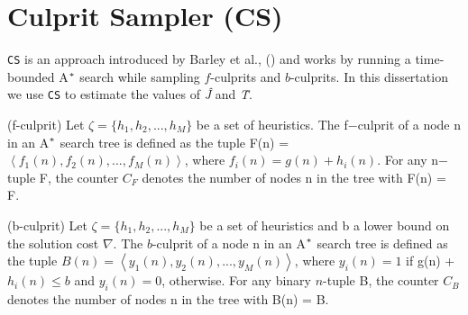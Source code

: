 \section{Culprit Sampler (CS)}
\noindent
\texttt{CS} is an approach introduced by Barley et al., (\citeyear{BarleySantiagoOver}) and works by running a time-bounded A$\sp{*}$ search while sampling $f$-culprits and $b$-culprits. In this dissertation we use \texttt{CS} to estimate the values of \textit{\^{J}} and \textit{\^{T}}.

\begin{definition}(f-culprit)
Let $\zeta = \{h_{1}, h_{2},...,h_{M}\}$ be a set of heuristics. The f$-$culprit of a node n in an A$\sp{*}$ search tree is defined as the tuple F(n) = $\left\langle f_{1}(n), f_{2}(n),...,f_{M}(n)  \right\rangle$, where $f_{i}(n) = g(n)+h_{i}(n)$. For any n$-$tuple F, the counter $C_{F}$ denotes the number of nodes n in the tree with F(n) = F.
\label{def:def_fculprits}
\end{definition}

\begin{definition}(b-culprit)
Let $\zeta = \{h_{1}, h_{2},...,h_{M}\}$ be a set of heuristics and b a lower bound on the solution cost $\nabla$. The $b$-culprit of a node n in an A$\sp{*}$ search tree is defined as the tuple $B(n) = \left\langle y_{1}(n), y_{2}(n),...,y_{M}(n)\right\rangle$, where $y_{i}(n) = 1$ if g(n) + $h_{i}(n) \leq b$ and $y_{i}(n) = 0$, otherwise.  For any binary $n$-tuple B, the counter $C_{B}$ denotes the number of nodes n in the tree with B(n) = B.
\label{def:def_bculprits}
\end{definition}

